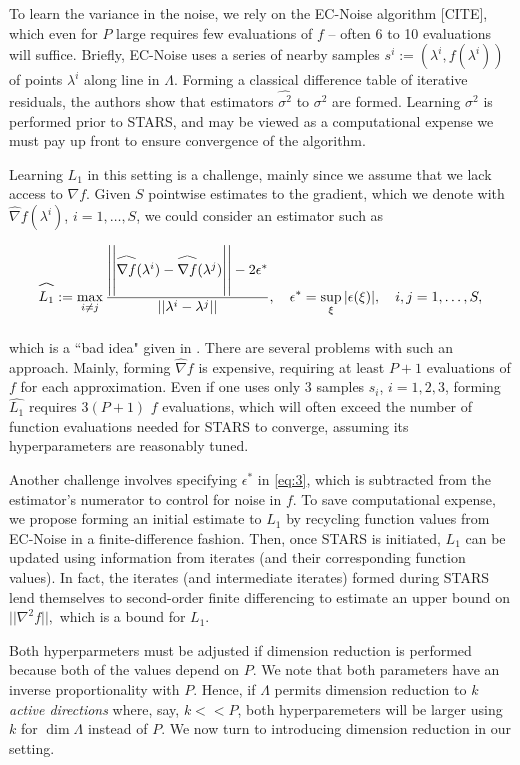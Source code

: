 \documentclass{amsart}
\newcommand\reallywidehat[1]{\arraycolsep=0pt\relax%
\begin{array}{c}
\stretchto{
  \scaleto{
    \scalerel*[\widthof{\ensuremath{#1}}]{\kern-.5pt\bigwedge\kern-.5pt}
    {\rule[-\textheight/2]{1ex}{\textheight}} %
  }{\textheight} %
}{0.5ex}\\           %
#1\\                 %
\rule{-1ex}{0ex}
\end{array}
}
\begin{document}
To learn the variance in the noise, we rely on the EC-Noise algorithm [CITE], which even for $P$ large requires few evaluations of $f$ -- often 6 to 10 evaluations will suffice. Briefly, EC-Noise uses a series of nearby samples $s^i:=(\lambda^i,f(\lambda^i))$ of points $\lambda^i$ along line in $\Lambda$. Forming a classical difference table of iterative residuals, the authors show that estimators $\hat{\sigma^2}$ to $\sigma^2$ are formed. Learning $\sigma^2$ is performed prior to STARS, and may be viewed as a computational expense we must pay up front to ensure convergence of the algorithm.

Learning $L_1$ in this setting is a challenge, mainly since we assume that we lack access to $\nabla f$. Given $S$ pointwise estimates to the gradient, which we denote with $\hat{\nabla}f(\lambda^i)$, $i=1,\ldots, S$, we could consider an estimator such as



\begin{equation} \label{eq:3}
\reallywidehat{L_1}:= \max_{i \neq j} \frac{\left|\left|\reallywidehat{\nabla f}(\lambda^{i})-\reallywidehat{\nabla f}(\lambda^{j})\right|\right|-2\epsilon^*}{||\lambda^{i}-\lambda^{j}||}, \quad \epsilon^*=\sup_\xi |\epsilon(\xi)|, \quad i,j=1,\ldots, S,
\end{equation} 

\noindent which is a ``bad idea" given in \cite{Calliess}. There are several problems with such an approach. Mainly, forming $\hat{\nabla} f$ is expensive, requiring at least $P+1$ evaluations of $f$ for each approximation. Even if one uses only 3 samples $s_i$, $i=1,2,3$, forming $\hat{L_1}$ requires $3(P+1)$ $f$ evaluations, which will often exceed the number of function evaluations needed for STARS to converge, assuming its hyperparameters are reasonably tuned.

Another challenge involves specifying $\epsilon^*$ in \eqref{eq:3}, which is subtracted from the estimator's numerator to control for noise in $f$. To save computational expense, we propose forming an initial estimate to $L_1$ by recycling function values from EC-Noise in a finite-difference fashion. Then, once STARS is initiated, $L_1$ can be updated using information from iterates (and their corresponding function values). In fact, the iterates (and intermediate iterates) formed during STARS lend themselves to second-order finite differencing to estimate an upper bound on $||\nabla ^2 f||,$ which is a bound for $L_1$.

Both hyperparmeters must be adjusted if dimension reduction is performed because both of the values depend on $P$. We note that both parameters have an inverse proportionality with $P$. Hence, if $\Lambda$ permits dimension reduction to $k$ \textit{active directions} where, say, $k<<P$, both hyperparemeters will be larger using $k$ for $\dim \Lambda$ instead of $P.$ We now turn to introducing dimension reduction in our setting.
\end{document}
